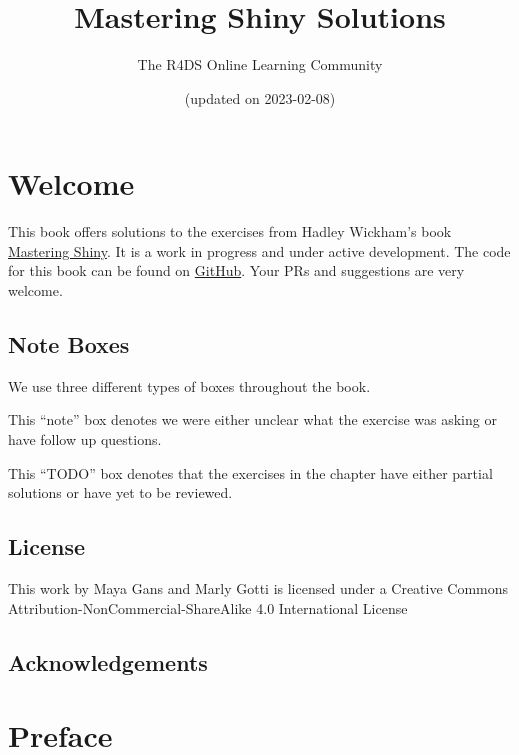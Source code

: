 \documentclass[
]{book}
\title{Mastering Shiny Solutions}
\author{The R4DS Online Learning Community}
\date{(updated on 2023-02-08)}
\theoremstyle{definition}
\theoremstyle{definition}
\theoremstyle{definition}
\theoremstyle{definition}
\theoremstyle{remark}
\begin{document}
\maketitle

{
\setcounter{tocdepth}{1}
\tableofcontents
}
\hypertarget{welcome}{%
\chapter*{Welcome}\label{welcome}}

This book offers solutions to the exercises from Hadley Wickham's book \href{https://mastering-shiny.org/}{Mastering Shiny}. It is a work in progress and under active development. The code for this book can be found on \href{https://github.com/r4ds/mastering_shiny_book_solutions}{GitHub}. Your PRs and suggestions are very welcome.

\hypertarget{note-boxes}{%
\section*{Note Boxes}\label{note-boxes}}

We use three different types of boxes throughout the book.

This ``note'' box denotes we were either unclear what the exercise was asking or have follow up questions.

This ``TODO'' box denotes that the exercises in the chapter have either partial solutions or have yet to be reviewed.

\hypertarget{license}{%
\section*{License}\label{license}}

This work by Maya Gans and Marly Gotti is licensed under a Creative Commons Attribution-NonCommercial-ShareAlike 4.0 International License

\hypertarget{acknowledgements}{%
\section*{Acknowledgements}\label{acknowledgements}}

\hypertarget{preface}{%
\chapter{Preface}\label{preface}}
\end{document}
